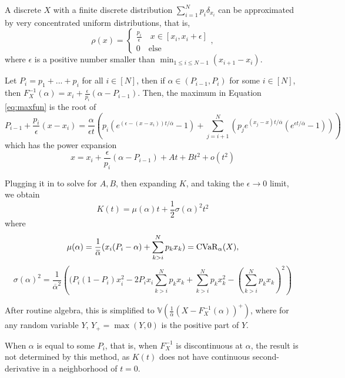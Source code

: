 \begin{ex}
A discrete $X$ with a finite discrete distribution $\sum_{i = 1}^N p_i \delta_{x_i}$ can be approximated by very concentrated uniform distributions, that is, 
$$\rho(x) = \begin{cases}
\frac{p_i}{\epsilon}\quad x\in[x_i, x_i+\epsilon]\\
0 \quad \text{else}
\end{cases}, 
$$
where $\epsilon$ is a positive number smaller than $\min_{1 \le i \le N-1}(x_{i+1} - x_i)$.

Let $P_i = p_1 + ... + p_i$ for all $i\in [N]$, then if $\alpha \in (P_{i-1}, P_i)$ for some $i\in [N]$, then $F_X^{-1}(\alpha) =x_i + \frac{\epsilon}{p_i} (\alpha - P_{i-1})$. Then, the maximum in Equation \ref{eq:maxfun} is the root of 
$$P_{i-1} + \frac{p_i}{\epsilon}(x-x_i) = \frac{\alpha}{\epsilon t}
\left(p_i \left(e^{(\epsilon - (x-x_i))t/{\overbar\alpha}} - 1\right) + 
\sum_{j = i+1}^N \left(p_j e^{(x_j - x)t/{\overbar\alpha}} \left(e^{\epsilon t/{\overbar\alpha}} - 1\right) \right)\right)$$
which has the power expansion
$$ x =  x_i + \frac{\epsilon}{p_i} (\alpha - P_{i-1}) + A t + Bt^2 + o(t^2)$$

Plugging it in to solve for $A, B$, then expanding $K$, and taking the $\epsilon \to 0$ limit, we obtain 
$$K(t) = \mu(\alpha) t + \frac 12 \sigma(\alpha)^2 t^2$$ 
where
\begin{equation}
\mu(\alpha) = \frac{1}{{\overbar\alpha}}( x_i (P_i - \alpha) + \sum_{k > i}^N p_k x_k) = \cvar_\alpha(X), 
\end{equation}
\begin{equation}
\sigma(\alpha)^2 = \frac{1}{{\overbar\alpha}^2} \left((P_i(1-P_i)x_i^2 - 2P_ix_i \sum_{k > i}^N p_k x_k + \sum_{k > i}^N p_k x_k^2 - \left(\sum_{k > i}^N p_k x_k\right)^2\right)
\end{equation}

After routine algebra, this is simplified to $\mathbb{V}\left(\frac 1{\overbar\alpha} (X - F_X^{-1}(\alpha))^+\right)$, where for any random variable $Y$, $Y_+ = \max(Y, 0)$ is the positive part of $Y$.
\end{ex}

When $\alpha$ is equal to some $P_i$, that is, when $F_X^{-1}$ is discontinuous at $\alpha$, the result is not determined by this method, as $K(t)$ does not have continuous second-derivative in a neighborhood of $t = 0$. 

